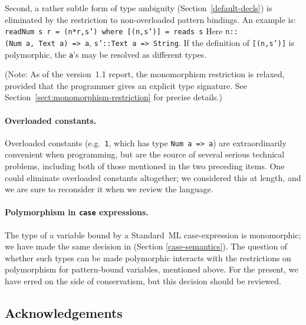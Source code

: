 Second, a rather subtle form of type 
ambiguity (Section~\ref{default-decls})
is eliminated by the restriction to non-overloaded pattern bindings.
An example is:
\bprog
\mbox{\tt readNum\ s\ r\ =\ (n*r,s')\ where\ [(n,s')]\ =\ reads\ s}
\eprog
Here \mbox{\tt n::(Num\ a,\ Text\ a)\ =>\ a}, \mbox{\tt s'::Text\ a\ =>\ String}.  If the
definition of \mbox{\tt [(n,s')]} is polymorphic, the \mbox{\tt a}'s may be resolved as
different types.

(Note: As of the version~1.1 report, the monomorphism restriction is
relaxed, provided that the programmer gives an explicit type
signature.  See Section~\ref{sect:monomorphism-restriction} for
precise details.)


\paragraph*{Overloaded constants.}
Overloaded constants (e.g.~\mbox{\tt 1}, which has type \mbox{\tt Num\ a\ =>\ a}) are
extraordinarily convenient when programming, but are the source of
several serious technical problems, including both of those mentioned
in the two preceding items.  One could eliminate overloaded
constants altogether; we considered this at length, and we are sure to
reconsider it when we review the language.

\paragraph*{Polymorphism in \mbox{\tt case} expressions.}

The type of a variable bound by a Standard~ML case-expression is monomorphic;
we have made the same decision in \Haskell{}
(Section \ref{case-semantics}).
The question of whether such types can be made polymorphic interacts
with the restrictions on polymorphism for pattern-bound variables,
mentioned above.  For the present, we have erred on the side of conservatism,
but this decision should be reviewed.



\subsection*{Acknowledgements}

